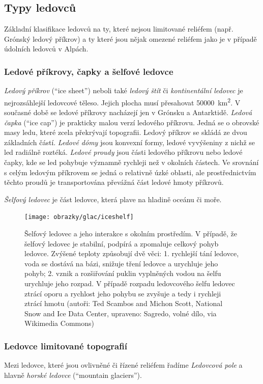 \subsection{Typy ledovců}
Základní klasifikace ledovců na ty, které nejsou limitované reliéfem (např. Grónský ledový příkrov) a ty které jsou nějak omezené reliéfem jako je v případě údolních ledovců v Alpách.

\subsubsection{Ledové příkrovy, čapky a šelfové ledovce}
\emph{Ledový příkrov} (\enquote{ice sheet}) neboli také \emph{ledový štít} či \emph{kontinentální ledovec} je nejrozsáhlejší ledovcové těleso. Jejich plocha musí přesahovat \SI{50000}{\square\kilo\metre}. V současné době se ledové příkrovy nacházejí jen v Grónsku a Antarktidě. \emph{Ledová čapka} (\enquote{ice cap}) je prakticky malou verzí ledového příkrovu. 
Jedná se o obrovské masy ledu, které zcela překrývají topografii. Ledový příkrov se skládá ze dvou základních částí. \emph{Ledové dómy} jsou konvexní formy, ledové vyvýšeniny z nichž se led radiálně roztéká. 
\emph{Ledové proudy} jsou části ledového příkrovu nebo ledové čapky, kde se led pohybuje významně rychleji než v okolních částech. Ve srovnání s celým ledovým příkrovem se jedná o relativně úzké oblasti, ale prostřednictvím těchto proudů je transportována převážná část ledové hmoty příkrovů. 

\emph{Šelfový ledovec} je část ledovce, která plave na hladině oceánu či moře. 

\begin{figure}[h]
	\centering
	\texttt{[image: obrazky/glac/iceshelf]}
	\caption{Šelfový ledovec a jeho interakce s okolním prostředím. V případě, že šelfový ledovec je stabilní, podpírá a zpomaluje celkový pohyb ledovce. Zvýšené teploty způsobují dvě věci: 1. rychlejší tání ledovce, voda se dostává na bázi, snižuje tření ledovce a urychluje jeho pohyb; 2. vznik a rozšiřování puklin vyplněných vodou na šelfu urychluje jeho rozpad. V případě rozpadu ledovcového šelfu ledovec ztrácí oporu a rychlost jeho pohybu se zvyšuje a tedy i rychleji ztrácí hmotu (autoři: Ted Scambos and Michon Scott, National Snow and Ice Data Center, upraveno: Sagredo, volné dílo, via Wikimedia Commons)}
	\label{fig:iceshelf}
\end{figure}

\subsubsection{Ledovce limitované topografií}
Mezi ledovce, které jsou ovlivněné či řízené reliéfem řadíme \emph{Ledovcová pole} a hlavně \emph{horské ledovce} (\enquote{mountain glaciers}).

